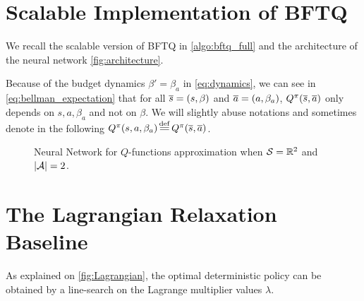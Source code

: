 
%

\section{Scalable Implementation of BFTQ}
\label{sec:bftq-full}

We recall the scalable version of BFTQ in \autoref{algo:bftq_full} and the architecture of the neural network \autoref{fig:architecture}.

\begin{remark}
Because of the budget dynamics $\beta' = \beta_a$ in \eqref{eq:dynamics}, we can see in \eqref{eq:bellman_expectation} that for all $\overline{s}=(s, \beta)$ and $\overline{a}=(a, \beta_a)$, $Q^\pi(\overline{s}, \overline{a})$ only depends on $s, a, \beta_a$ and not on $\beta$. We will slightly abuse notations and sometimes denote in the following $Q^\pi(s, a, \beta_a) \eqdef Q^\pi(\os, \oa)$.
\end{remark}

\begin{figure}[tp]
    \centering
    
    \caption{Neural Network for $Q$-functions approximation when $\mathcal{S}=\mathbb{R}^2$ and $|\mathcal{A}| = 2$.}
    \label{fig:architecture}
\end{figure}



\section{The Lagrangian Relaxation Baseline}
\label{sec:lagragian}
As explained on \autoref{fig:Lagrangian}, the optimal deterministic policy can be obtained by a line-search on the Lagrange multiplier values $\lambda$.


